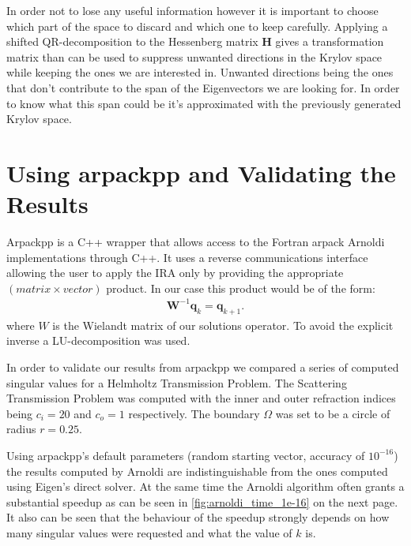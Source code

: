 \documentclass[a4paper, oneside]{discothesis}
\begin{document}
In order not to lose any useful information however it is important to choose which part of the space to discard and which one to keep carefully.
Applying a shifted QR-decomposition to the Hessenberg matrix $\mathbf{H}$ gives a transformation matrix than can be used to suppress unwanted directions in the Krylov space while keeping the ones we are interested in.
Unwanted directions being the ones that don't contribute to the span of the Eigenvectors we are looking for.
In order to know what this span could be it's approximated with the previously generated Krylov space.

\section{Using arpackpp and Validating the Results}\label{sec:first_results}
Arpackpp is a C++ wrapper that allows access to the Fortran arpack\cite{arpackweb} Arnoldi implementations through C++.
It uses a reverse communications interface allowing the user to apply the IRA only by providing the appropriate $(matrix\times vector)$ product.
In our case this product would be of the form:
\begin{align}
	\mathbf{W}^{-1} \mathbf{q}_k = \mathbf{q}_{k+1}.
\end{align}
where $W$ is the Wielandt matrix of our solutions operator.
To avoid the explicit inverse a LU-decomposition was used.

In order to validate our results from arpackpp we compared a series of computed singular values for a Helmholtz Transmission Problem.
The Scattering Transmission Problem was computed with the inner and outer refraction indices being $c_i=20$ and $c_o=1$ respectively.
The boundary $\Omega$ was set to be a circle of radius $r=0.25$.

Using arpackpp's default parameters (random starting vector, accuracy of $10^{-16}$) the results computed by Arnoldi are indistinguishable from the ones computed using Eigen's direct solver.
At the same time the Arnoldi algorithm often grants a substantial speedup as can be seen in \ref{fig:arnoldi_time_1e-16} on the next page.
It also can be seen that the behaviour of the speedup strongly depends on how many singular values were requested and what the value of $k$ is.
\end{document}
